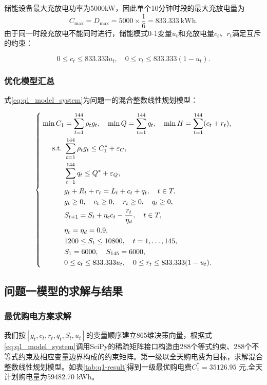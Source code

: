 \documentclass{cumcm2026}
\begin{document}
储能设备最大充放电功率为5000kW，因此单个10分钟时段的最大充放电量为
$$
C_{\max}=D_{\max}=5000\times\frac{1}{6}=833.333\ \mathrm{kWh}.
$$
由于同一时段充放电不能同时进行，储能模式0-1变量$u_t$和充放电量$c_t$、$r_t$满足互斥的约束：

$$
  0\leq c_t\leq833.333u_t,\quad 0\leq r_t\leq833.333(1-u_t).
  \label{eq:q1-model}
$$

\subsubsection{优化模型汇总}
式\eqref{eq:q1_model_system}为问题一的混合整数线性规划模型：

\begin{equation}
\left\{
\begin{aligned}
\min C_1 &= \sum_{t=1}^{144}\rho_t g_t,
\quad \min Q=\sum_{t=1}^{144}q_t,
\quad \min H=\sum_{t=1}^{144}(c_t+r_t), \\
\quad\quad\mkern-8mu\mathrm{s.t.}\ 
&\sum_{t=1}^{144}\rho_t g_t\leq C_1^*+\varepsilon_C,\\
&\sum_{t=1}^{144}q_t \leq Q^*+\varepsilon_Q, \\
&g_t+R_t+r_t = L_t+c_t+q_t,\quad t\in T, \\
&g_t \geq 0,\quad c_t\geq 0,\quad r_t\geq 0,\quad q_t\geq 0, \\
& S_{t+1} = S_t+\eta_c c_t-\frac{r_t}{\eta_d},\quad t\in T, \\
&\eta_c = \eta_d=0.9, \\
&1200 \leq S_t\leq10800,\quad t=1,\ldots,145, \\
&S_1 = 6000,\quad S_{145}=6000, \\
&0 \leq c_t\leq833.333u_t,
\quad 0\leq r_t\leq833.333(1-u_t).
\end{aligned}
\right.
\label{eq:q1_model_system}
\end{equation}



\subsection{问题一模型的求解与结果}

\subsubsection{最优购电方案求解}
我们按$[g_t,c_t,r_t,q_t,S_t,u_t]$的变量顺序建立865维决策向量，根据式\eqref{eq:q1_model_system}调用SciPy的稀疏矩阵接口构造由288个等式约束、288个不等式约束及相应变量边界构成的约束矩阵。第一级以全天购电费为目标，求解混合整数线性规划模型。如表\ref{tab:q1-result}得到一级最优购电费$C_1^*=35126.95$ 元,全天计划购电量为59482.70 kWh。
\end{document}
